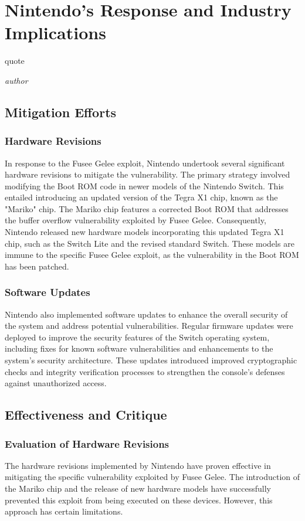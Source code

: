 \chapter{Nintendo's Response and Industry Implications}
\epigraph{quote}{\textit{author}}

\section{Mitigation Efforts}

\subsection{Hardware Revisions}
In response to the Fusee Gelee exploit, Nintendo undertook several significant hardware revisions to mitigate the vulnerability. The primary strategy involved modifying the Boot ROM code in newer models of the Nintendo Switch. This entailed introducing an updated version of the Tegra X1 chip, known as the "Mariko" chip.\cite{SwitchSystemFlaws} The Mariko chip features a corrected Boot ROM that addresses the buffer overflow vulnerability exploited by Fusee Gelee. Consequently, Nintendo released new hardware models incorporating this updated Tegra X1 chip, such as the Switch Lite and the revised standard Switch. These models are immune to the specific Fusee Gelee exploit, as the vulnerability in the Boot ROM has been patched.
\subsection{Software Updates}
Nintendo also implemented software updates to enhance the overall security of the system and address potential vulnerabilities. Regular firmware updates were deployed to improve the security features of the Switch operating system, including fixes for known software vulnerabilities and enhancements to the system's security architecture. These updates introduced improved cryptographic checks and integrity verification processes to strengthen the console's defenses against unauthorized access.


\section{Effectiveness and Critique}

\subsection{Evaluation of Hardware Revisions}
The hardware revisions implemented by Nintendo have proven effective in mitigating the specific vulnerability exploited by Fusee Gelee. The introduction of the Mariko chip and the release of new hardware models have successfully prevented this exploit from being executed on these devices. However, this approach has certain limitations.

